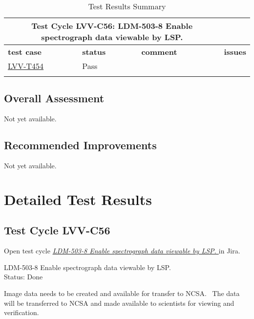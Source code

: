 \documentclass[DM,lsstdraft,STR,toc]{lsstdoc}
\begin{document}
\begin{longtable}{p{}p{}p{}p{}}
\toprule

  \multicolumn{3}{c}{ Test Cycle {\bf LVV-C56: LDM-503-8 Enable spectrograph data viewable by LSP.
 }} \\\hline

  {\bf \footnotesize test case} & {\bf \footnotesize status} & {\bf \footnotesize comment} & {\bf \footnotesize issues} \\\toprule

    \href{https://jira.lsstcorp.org/secure/Tests.jspa#/testCase/LVV-T454}{LVV-T454}
    & Pass &  &
    \\\hline

\caption{Test Results Summary}
\label{table:summary}
\end{longtable}

\subsection{Overall Assessment}
\label{sect:overallassessment}

Not yet available.

\subsection{Recommended Improvements}
\label{sect:recommendations}

Not yet available.

\newpage
\section{Detailed Test Results}
\label{sect:detailedtestresults}


  \subsection{Test Cycle LVV-C56 }

Open test cycle {\it \href{https://jira.lsstcorp.org/secure/Tests.jspa#/testrun/LVV-C56}{LDM-503-8 Enable spectrograph data viewable by LSP.
}} in Jira.

  LDM-503-8 Enable spectrograph data viewable by LSP.
\\
  Status: Done

  Image data needs to be created and available for transfer to NCSA. ~The
data will be transferred to NCSA and made available to scientists for
viewing and verification.~ ~~
\end{document}
